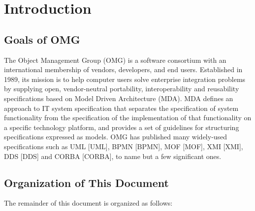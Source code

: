 \ifthenelse{\equal{\iprmode}{\xspace}}
{}
{}

\newpage
\tableofcontents
\newpage

\section{Introduction}
\subsection{Goals of OMG}
The Object Management Group (OMG) is a software consortium with an international membership of vendors, developers, and end users. Established in 1989, its mission is to help computer users solve enterprise integration problems by supplying open, vendor-neutral portability, interoperability and reusability specifications based on Model Driven Architecture (MDA). MDA defines an approach to IT system specification that separates the specification of system functionality from the specification of the implementation of that functionality on a specific technology platform, and provides a set of guidelines for structuring specifications expressed as models. OMG has published many widely-used specifications such as UML [UML], BPMN [BPMN], MOF [MOF], XMI [XMI], DDS [DDS] and CORBA [CORBA], to name but a few significant ones.

\subsection{Organization of This Document}\label{docorg}
The remainder of this document is organized as follows:

